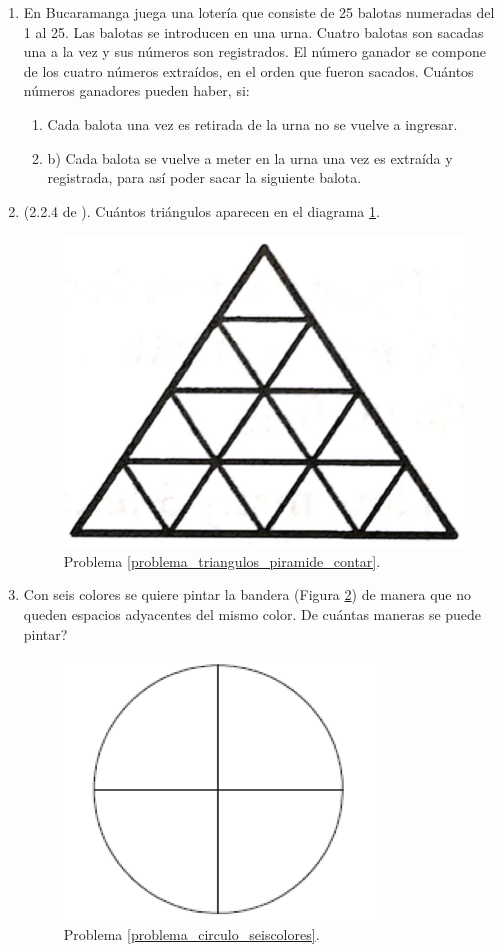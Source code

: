 \begin{enumerate}
	\item En Bucaramanga juega una lotería que consiste de 25 balotas numeradas del 1 al 25. Las balotas se introducen en una urna. Cuatro balotas son sacadas una a la vez y sus números son registrados. El número ganador se compone de los cuatro números extraídos, en el orden que fueron sacados. Cuántos números ganadores pueden haber, si:
	\begin{enumerate}
		\item Cada balota una vez es retirada de la urna no se vuelve a ingresar.
		\item b)	Cada balota se vuelve a meter en la urna una vez es extraída y registrada, para así poder sacar la siguiente balota.
	\end{enumerate}
	
	\item \label{problema_triangulos_piramide_contar} (2.2.4 de \cite{ICP_Aops}). Cuántos triángulos aparecen en el diagrama \ref{trainguloscontar}.
	\begin{figure}
		\centering
		\includegraphics[width=0.5\linewidth]{Combinatoria/imgs/traingulos_contar}
		\caption{Problema \ref{problema_triangulos_piramide_contar}.}
		\label{trainguloscontar}
	\end{figure}
	
	\item \label{problema_circulo_seiscolores} Con seis colores se quiere pintar la bandera (Figura \ref{circulo4franjas}) de manera que no queden espacios adyacentes del mismo color. De cuántas maneras se puede pintar?
	\begin{figure}
		\centering
		\includegraphics[width=0.4\linewidth]{Combinatoria/imgs/circulo_4_franjas}
		\caption{Problema \ref{problema_circulo_seiscolores}.}
		\label{circulo4franjas}
	\end{figure}
	

\end{enumerate}
